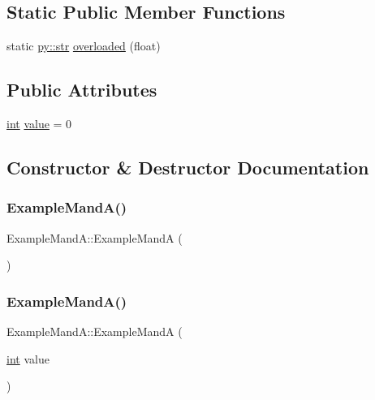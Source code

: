 \subsection*{Static Public Member Functions}
\begin{DoxyCompactItemize}
\item 
static \mbox{\hyperlink{node_8h_a62b34ca1362fe946082b7aa0cd9be844}{py\+::str}} \mbox{\hyperlink{class_example_mand_a_a56779090f2926f5037d3d98f676c8a2a}{overloaded}} (float)
\end{DoxyCompactItemize}
\subsection*{Public Attributes}
\begin{DoxyCompactItemize}
\item 
\mbox{\hyperlink{warnings_8h_a74f207b5aa4ba51c3a2ad59b219a423b}{int}} \mbox{\hyperlink{class_example_mand_a_a7b5204fbe97e4e84180ae41a0016ab04}{value}} = 0
\end{DoxyCompactItemize}


\subsection{Constructor \& Destructor Documentation}
\mbox{\label{class_example_mand_a_a0cb8381fd54c3e1ae7a1143a8c7a047a}} 
\subsubsection{\texorpdfstring{ExampleMandA()}{ExampleMandA()}\hspace{0.1cm}{\footnotesize\ttfamily [1/4]}}
{\footnotesize\ttfamily Example\+Mand\+A\+::\+Example\+MandA (\begin{DoxyParamCaption}{ }\end{DoxyParamCaption})\hspace{0.3cm}{\ttfamily [inline]}}

\mbox{\label{class_example_mand_a_ad0f8112ebdf7dfa31793873c0e815067}} 
\subsubsection{\texorpdfstring{ExampleMandA()}{ExampleMandA()}\hspace{0.1cm}{\footnotesize\ttfamily [2/4]}}
{\footnotesize\ttfamily Example\+Mand\+A\+::\+Example\+MandA (\begin{DoxyParamCaption}\item[{\mbox{\hyperlink{warnings_8h_a74f207b5aa4ba51c3a2ad59b219a423b}{int}}}]{value }\end{DoxyParamCaption})\hspace{0.3cm}{\ttfamily [inline]}}

